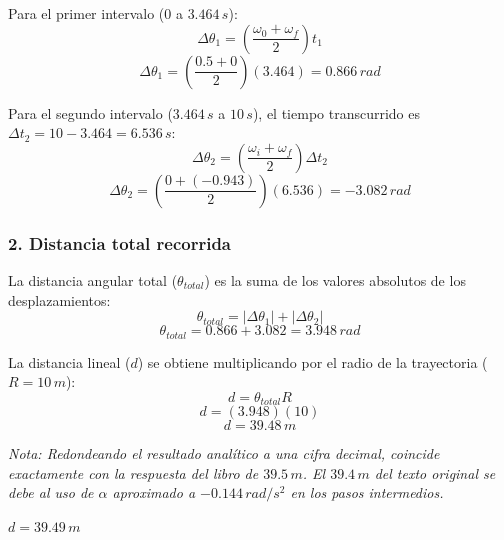 \documentclass[12pt, a4paper]{article}
\begin{document}
Para el primer intervalo ($0$ a $3.464 \, \si{s}$):
$$ \Delta\theta_1 = \left( \frac{\omega_0 + \omega_f}{2} \right) t_1 $$
$$ \Delta\theta_1 = \left( \frac{0.5 + 0}{2} \right) (3.464) = 0.866 \, \si{rad} $$

Para el segundo intervalo ($3.464 \, \si{s}$ a $10 \, \si{s}$), el tiempo transcurrido es $\Delta t_2 = 10 - 3.464 = 6.536 \, \si{s}$:
$$ \Delta\theta_2 = \left( \frac{\omega_i + \omega_f}{2} \right) \Delta t_2 $$
$$ \Delta\theta_2 = \left( \frac{0 + (-0.943)}{2} \right) (6.536) = -3.082 \, \si{rad} $$

\subsubsection*{2. Distancia total recorrida}
La distancia angular total ($\theta_{total}$) es la suma de los valores absolutos de los desplazamientos:
$$ \theta_{total} = |\Delta\theta_1| + |\Delta\theta_2| $$
$$ \theta_{total} = 0.866 + 3.082 = 3.948 \, \si{rad} $$

La distancia lineal ($d$) se obtiene multiplicando por el radio de la trayectoria ($R = 10 \, \si{m}$):
$$ d = \theta_{total} R $$
$$ d = (3.948)(10) $$
$$ d = 39.48 \, \si{m} $$

\textit{Nota: Redondeando el resultado analítico a una cifra decimal, coincide exactamente con la respuesta del libro de $39.5 \, \si{m}$. El $39.4 \, \si{m}$ del texto original se debe al uso de $\alpha$ aproximado a $-0.144 \, \si{rad/s^2}$ en los pasos intermedios.}

\begin{tcolorbox}[colback=green!5!white, colframe=green!50!black, title=Respuesta Final]
\centering \Large $d = 39.49 \, \si{m}$
\end{tcolorbox}
\end{document}
